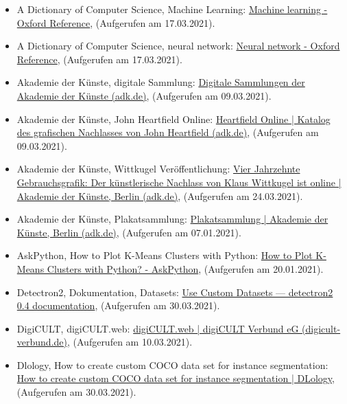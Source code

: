\documentclass[a4paper,12pt,ngerman]{article}
\begin{document}
\begin{itemize}
\item A Dictionary of Computer Science, Machine Learning: \href{https://www.oxfordreference.com/view/10.1093/acref/9780199688975.001.0001/acref-9780199688975-e-3056?rskey=8mKnpL\&result=1}{Machine learning - Oxford Reference}, (Aufgerufen am 17.03.2021).
\item A Dictionary of Computer Science, neural network: \href{https://www.oxfordreference.com/view/10.1093/acref/9780199688975.001.0001/acref-9780199688975-e-3475?rskey=q7GLM6\&result=3842}{Neural network - Oxford Reference}, (Aufgerufen am 17.03.2021).
\item Akademie der Künste, digitale Sammlung: \href{https://digital.adk.de/}{Digitale Sammlungen der Akademie der Künste (adk.de)}, (Aufgerufen am 09.03.2021).
\item Akademie der Künste, John Heartfield Online: \href{https://heartfield.adk.de/}{Heartfield Online | Katalog des grafischen Nachlasses von John Heartfield (adk.de)}, (Aufgerufen am 09.03.2021).
\item Akademie der Künste, Wittkugel Veröffentlichung: \href{https://www.adk.de/de/news/?we_objectID=56717}{Vier Jahrzehnte Gebrauchsgrafik: Der künstlerische Nachlass von Klaus Wittkugel ist online | Akademie der Künste, Berlin (adk.de)}, (Aufgerufen am 24.03.2021).
\item Akademie der Künste, Plakatsammlung: \href{https://www.adk.de/de/archiv/kunstsammlung/plakatsammlung.htm}{Plakatsammlung | Akademie der Künste, Berlin (adk.de)}, (Aufgerufen am 07.01.2021).
\item AskPython, How to Plot K-Means Clusters with Python: \href{https://www.askpython.com/python/examples/plot-k-means-clusters-python}{How to Plot K-Means Clusters with Python? - AskPython}, (Aufgerufen am 20.01.2021).
\item Detectron2, Dokumentation, Datasets: \href{https://detectron2.readthedocs.io/en/latest/tutorials/datasets.html}{Use Custom Datasets — detectron2 0.4 documentation}, (Aufgerufen am 30.03.2021).
\item DigiCULT, digiCULT.web: \href{https://www.digicult-verbund.de/de/digicultweb}{digiCULT.web | digiCULT Verbund eG (digicult-verbund.de)}, (Aufgerufen am 10.03.2021).
\item Dlology, How to create custom COCO data set for instance segmentation: \href{https://www.dlology.com/blog/how-to-create-custom-coco-data-set-for-instance-segmentation/}{How to create custom COCO data set for instance segmentation | DLology}, (Aufgerufen am 30.03.2021).

\end{itemize}
\end{document}
